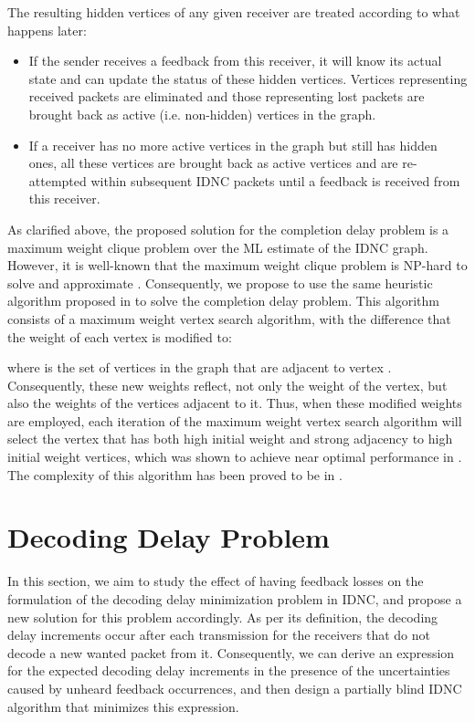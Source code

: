 \documentclass[10pt,jounral]{IEEEtran}
\newcommand{\ignore}[1]{}
\begin{document}
The resulting hidden vertices of any given receiver are treated according to what happens later:
\begin{itemize}
\item If the sender receives a feedback from this receiver, it will know its actual state and can update the status of these hidden vertices. Vertices representing received packets are eliminated and those representing lost packets are brought back as active (i.e. non-hidden) vertices in the graph.
\item If a receiver has no more active vertices in the graph but still has hidden ones, all these vertices are brought back as active vertices and are re-attempted within subsequent IDNC packets until a feedback is received from this receiver.\ignore{ If later a feedback comes from this receiver, before all these re-activated vertices are attempted, their actual status is updated similar to the above case (i.e. removed if received and kept as active if lost).}
\end{itemize}

As clarified above, the proposed solution for the completion delay problem is a maximum weight clique problem over the ML estimate of the IDNC graph. However, it is well-known that the maximum weight clique problem is NP-hard to solve and approximate \cite{Garey1979,Ausiello1999}. Consequently, we propose to use the same heuristic algorithm proposed in \cite{ICC10,TON10-CD} to solve the completion delay problem\ignore{ in perfect feedback scenarios}. This algorithm consists of a maximum weight vertex search algorithm, with the difference that the weight  of each vertex  is modified to:

where  is the set of vertices in the graph that are adjacent to vertex . Consequently, these new weights reflect, not only the weight of the vertex, but also the weights of the vertices adjacent to it.\ignore{ This is done using the following procedure:} Thus, when these modified weights are employed, each iteration of the maximum weight vertex search algorithm will select the vertex that has both high initial weight and strong adjacency to high initial weight vertices, which was shown to achieve near optimal performance in \cite{TON10-CD}. The complexity of this algorithm has been proved to be  in \cite{TON10-CD}.



\section{Decoding Delay Problem} \label{sec:DD-extension}
In this section, we aim to study the effect of having feedback losses on the formulation of the decoding delay minimization problem in IDNC, and propose a new solution for this problem accordingly. As per its definition, the decoding delay increments occur after each transmission for the receivers that do not decode a new wanted packet from it. Consequently, we can derive an expression for the expected decoding delay increments in the presence of the uncertainties caused by unheard feedback occurrences, and then design a partially blind IDNC algorithm that minimizes this expression.\ignore{ Thus, we will start by deriving this expression in the next subsection.}
\end{document}
